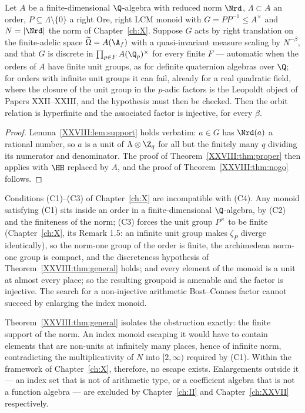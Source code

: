 \begin{theorem}[General no-go]\label{XXVIII:thm:general}
Let $A$ be a finite-dimensional $\Q$-algebra with reduced norm $\Nrd$, $\Lambda\subset A$ an
order, $P\subseteq\Lambda\setminus\{0\}$ a right Ore, right LCM monoid with $G=PP^{-1}\le A^\times$
and $N=|\Nrd|$ the norm of Chapter~\ref{ch:X}. Suppose $G$ acts by right translation on the finite-adelic
space $\widetilde\Omega=A(\A_f)$ with a quasi-invariant measure scaling by $N^{-\beta}$, and that
$G$ is discrete in $\prod_{p\in F}A(\Q_p)^\times$ for every finite $F$ --- automatic when
the orders of $A$ have finite unit groups, as for definite quaternion algebras over $\Q$;
for orders with infinite unit groups it can fail, already for a real quadratic field, where
the closure of the unit group in the $p$-adic factors is the Leopoldt object of Papers
XXII--XXIII, and the hypothesis must then be checked. Then the
orbit relation is hyperfinite and the associated factor is injective, for every $\beta$.
\end{theorem}

\begin{proof}
Lemma~\ref{XXVIII:lem:support} holds verbatim: $a\in G$ has $\Nrd(a)$ a rational number, so $a$ is a unit
of $\Lambda\otimes\Z_q$ for all but the finitely many $q$ dividing its numerator and denominator.
The proof of Theorem~\ref{XXVIII:thm:proper} then applies with $\HH$ replaced by $A$, and the proof of
Theorem~\ref{XXVIII:thm:nogo} follows.
\end{proof}

\begin{corollary}\label{XXVIII:cor:closed}
Conditions (C1)--(C3) of Chapter~\ref{ch:X} are incompatible with (C4). Any monoid satisfying (C1) sits inside
an order in a finite-dimensional $\Q$-algebra, by (C2) and the finiteness of the norm; (C3)
forces the unit group $P^\times$ to be finite (Chapter~\ref{ch:X}, its Remark 1.5: an infinite unit
group makes $\zeta_P$ diverge identically), so the norm-one group of the order is finite,
the archimedean norm-one group is compact, and the discreteness hypothesis of
Theorem~\ref{XXVIII:thm:general} holds; and every
element of the monoid is a unit at almost every place; so the resulting groupoid is amenable and the factor
is injective. The search for a non-injective arithmetic Bost--Connes factor cannot succeed by
enlarging the index monoid.
\end{corollary}

\begin{remark}\label{XXVIII:rem:escape}
Theorem~\ref{XXVIII:thm:general} isolates the obstruction exactly: the finite support of the norm. An
index monoid escaping it would have to contain elements that are non-units at infinitely many
places, hence of infinite norm, contradicting the multiplicativity of $N$ into $[2,\infty)$
required by (C1). Within the framework of Chapter~\ref{ch:X}, therefore, no escape exists. Enlargements
outside it --- an index set that is not of arithmetic type, or a coefficient algebra that is not a
function algebra --- are excluded by Chapter~\ref{ch:II} and Chapter~\ref{ch:XXVII} respectively.
\end{remark}

